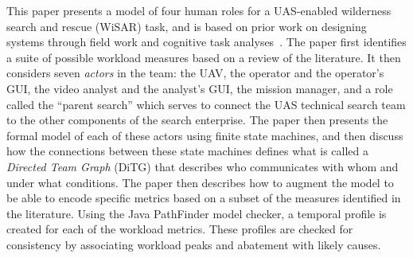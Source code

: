 This paper presents a model of four human roles for a UAS-enabled wilderness search and rescue (WiSAR) task, and is based on prior work on designing systems through field work and cognitive task analyses~\cite{Adams2008,GoodrichMorse2008}.  The paper first identifies a suite of possible workload measures based on a review of the literature.  It then considers seven {\em actors} in the team: the UAV, the operator and the operator's GUI, the video analyst and the analyst's GUI, the mission manager, and a role called the ``parent search'' which serves to connect the UAS technical search team to the other components of the search enterprise.  The paper then presents the formal model of each of these actors using finite state machines, and then discuss how the connections between these state machines defines what is called a {\em Directed Team Graph} (DiTG) that describes who communicates with whom and under what conditions.  The paper then describes how to augment the model to be able to encode specific metrics based on a subset of the measures identified in the literature.  Using the Java PathFinder model checker, a temporal profile is created for each of the workload metrics. These profiles are checked for consistency by associating workload peaks and abatement with likely causes. 

